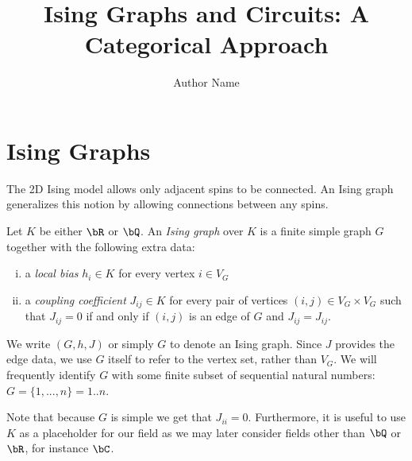 
\usepackage{indentfirst}

\title{Ising Graphs and Circuits: A Categorical Approach}
\date{}
\author{Author Name}

\usepackage{titling}
\renewcommand\maketitlehooka{\null\mbox{}\vfill}
\renewcommand\maketitlehookd{\vfill\null}

\setcounter{page}{1}
\maketitle

\newpage

\tableofcontents

\newpage
\section{Ising Graphs}
The 2D Ising model allows only adjacent spins to be connected. An Ising graph generalizes this notion by allowing connections between any spins.
\begin{defn}\label{defn:ising-graph}
	Let $K$ be either $\bR$ or $\bQ$. An \emph{Ising graph} over $K$ is a finite simple graph $G$ together with the following extra data:
	\begin{enumerate}[(i)]
		\item a \emph{local bias} $h_i \in K$ for every vertex $i\in V_G$
		\item a \emph{coupling coefficient} $J_{ij} \in K$ for every pair of vertices $(i,j) \in V_G \times V_G$ such that $J_{ij} = 0$ if and only if $(i,j)$ is an edge of $G$ and $J_{ij} = J_{ij}$.
	\end{enumerate}
	We write $(G,h,J)$ or simply $G$ to denote an Ising graph. Since $J$ provides the edge data, we use $G$ itself to refer to the vertex set, rather than $V_G$. We will frequently identify $G$ with some finite subset of sequential natural numbers: $G = \{1,...,n\} = 1..n$.
\end{defn}
Note that because $G$ is simple we get that $J_{ii} = 0$. Furthermore, it is useful to use $K$ as a placeholder for our field as we may later consider fields other than $\bQ$ or $\bR$, for instance $\bC$.

